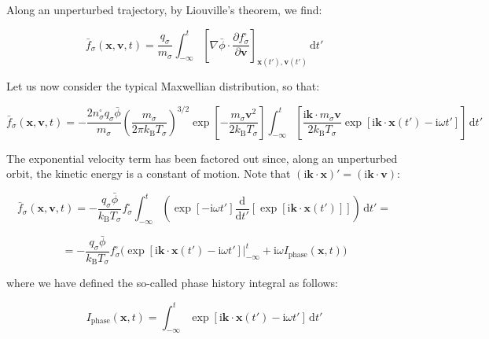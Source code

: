 Along an unperturbed trajectory, by Liouville's theorem, we find:

\begin{equation}
    \bar{f}_\sigma(\mathbf{x},\mathbf{v},t)=\frac{q_\sigma}{m_\sigma}\int_{-\infty}^t\left[\nabla\bar{\phi}\cdot\frac{\partial f_\sigma^\square}{\partial\mathbf{v}}\right]_{\mathbf{x}(t'),\mathbf{v}(t')}\,\mathrm{d}t'
\end{equation}

Let us now consider the typical Maxwellian distribution, so that:

\begin{equation}
    \bar{f}_\sigma(\mathbf{x},\mathbf{v},t)=-\frac{2n_\sigma^\square q_\sigma\bar{\phi}}{m_\sigma}\left(\frac{m_\sigma}{2\pi k_\mathrm{B}T_\sigma}\right)^{3/2}\exp{\left[-\frac{m_\sigma\mathbf{v}^2}{2k_\mathrm{B}T_\sigma}\right]}\int_{-\infty}^t\left[\frac{\mathrm{i}\mathbf{k}\cdot m_\sigma\mathbf{v}}{2k_\mathrm{B}T_\sigma}\exp{\left[\mathrm{i}\mathbf{k}\cdot\mathbf{x}(t')-\mathrm{i}\omega t'\right]}\right]\,\mathrm{d}t'
\end{equation}

The exponential velocity term has been factored out since, along an unperturbed orbit, the kinetic energy is a constant of motion. Note that $(\mathrm{i}\mathbf{k}\cdot\mathbf{x})'=(\mathrm{i}\mathbf{k}\cdot\mathbf{v})$:

\begin{equation}
    \bar{f}_\sigma(\mathbf{x},\mathbf{v},t)=-\frac{q_\sigma\bar{\phi}}{k_\mathrm{B}T_\sigma}f_\sigma^\square\int_{-\infty}^t\left(\exp{[-\mathrm{i}\omega t']}\frac{\mathrm{d}}{\mathrm{d}t'}\left[\exp{[\mathrm{i}\mathbf{k}\cdot\mathbf{x}(t')]}\right]\right)\,\mathrm{d}t'=
\end{equation}

\begin{equation}
    =-\frac{q_\sigma\bar{\phi}}{k_\mathrm{B}T_\sigma}f_\sigma^\square\bigg(\exp{\left[\mathrm{i}\mathbf{k}\cdot\mathbf{x}(t')-\mathrm{i}\omega t'\right]}\Bigr|_{-\infty}^t+\mathrm{i}\omega I_\text{phase}(\mathbf{x},t)\bigg)
\end{equation}

where we have defined the so-called phase history integral as follows:

\begin{equation}
    I_\text{phase}(\mathbf{x},t)=\int_{-\infty}^t\exp{\left[\mathrm{i}\mathbf{k}\cdot\mathbf{x}(t')-\mathrm{i}\omega t'\right]}\,\mathrm{d}t'
\end{equation}

